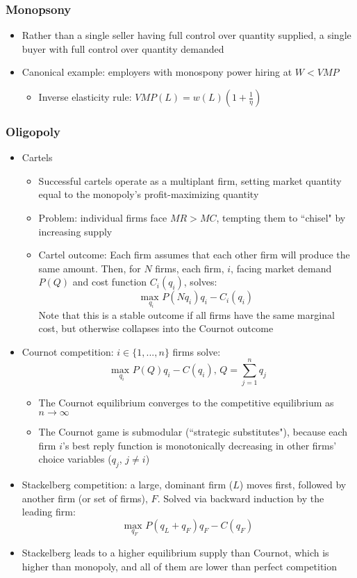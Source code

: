 \documentclass{article}
\newcommand{\usmax}[1]{\underset{#1}{\text{max }}}
\newcommand{\blue}[1]{{\color{blue}#1}}
\begin{document}
\subsubsection{Monopsony}
\begin{itemize}
	\item Rather than a single seller having full control over quantity supplied, a single buyer with full control over quantity demanded 
	\item Canonical example: employers with monospony power hiring at $W<VMP$
		\begin{itemize}
			\item Inverse elasticity rule: $VMP(L) = w(L)\left(1 + \frac{1}{\eta}\right)$
		\end{itemize}
\end{itemize}

\subsubsection{Oligopoly}
\begin{itemize}
	\item Cartels
		\begin{itemize}
			\item Successful cartels operate as a multiplant firm, setting market quantity equal to the monopoly's profit-maximizing quantity
			\item Problem: individual firms face $MR>MC$, tempting them to ``chisel" by increasing supply
			\item \blue{Cartel outcome:} Each firm assumes that each other firm will produce the same amount. Then, for $N$ firms, each firm, $i$, facing market demand $P(Q)$ and cost function $C_i(q_i)$, solves:
				\[
					\usmax{q_i}P(Nq_i)q_i - C_i(q_i)
				\]
				Note that this is a stable outcome if all firms have the same marginal cost, but otherwise collapses into the Cournot outcome
		\end{itemize}
	\item Cournot competition: $i\in\{1,...,n\}$ firms solve:
		\[
			\usmax{q_i}P(Q)q_i-C(q_i)\text{, }Q=\sum_{j=1}^nq_j
		\]
		\begin{itemize}
			\item The Cournot equilibrium converges to the competitive equilibrium as $n\rightarrow\infty$
			\item The Cournot game is submodular (``strategic substitutes"), because each firm $i$'s best reply function is monotonically decreasing in other firms' choice variables ($q_j$, $j\neq i$)
		\end{itemize}
	\item Stackelberg competition: a large, dominant firm ($L$) moves first, followed by another firm (or set of firms), $F$. Solved via backward induction by the leading firm:
		\[
			\usmax{q_F}P(q_L+q_F)q_F-C(q_F)
		\]
	\item Stackelberg leads to a higher equilibrium supply than Cournot, which is higher than monopoly, and all of them are lower than perfect competition
\end{itemize}
\end{document}
